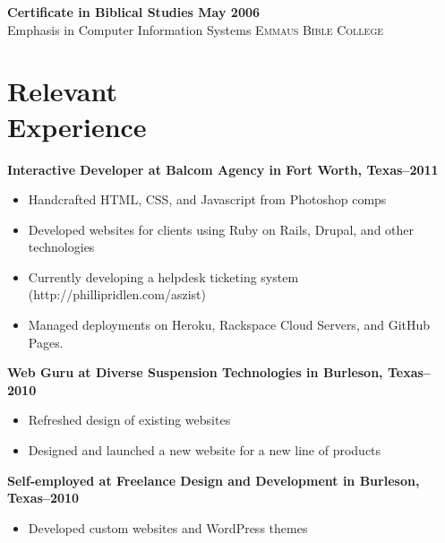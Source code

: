\documentclass[margin]{res}
\newcommand{\sectionspace}{\vspace{10pt}}
\begin{document}
\begin{resume}
                \textbf{Certificate in Biblical Studies \dotfill May 2006 }  \\
                Emphasis in Computer Information Systems \hfill \textsc{Emmaus Bible College}

\sectionspace


\section{
Relevant \\ Experience}

              
                \textbf{Interactive Developer
                 at Balcom Agency in Fort Worth, Texas--2011}
                 \vspace{-10pt}\begin{itemize} \itemsep -2pt %
                   \item Handcrafted HTML, CSS, and Javascript from Photoshop comps
                 
                   \item Developed websites for clients using Ruby on Rails, Drupal, and other technologies
                 
                   \item Currently developing a helpdesk ticketing system (http://phillipridlen.com/aszist)
                 
                   \item Managed deployments on Heroku, Rackspace Cloud Servers, and GitHub Pages.
                 \end{itemize}
              
                \textbf{Web Guru
                 at Diverse Suspension Technologies in Burleson, Texas--2010}
                 \vspace{-10pt}\begin{itemize} \itemsep -2pt %
                   \item Refreshed design of existing websites
                 
                   \item Designed and launched a new website for a new line of products
                 \end{itemize}
              
                \textbf{Self-employed
                 at Freelance Design and Development in Burleson, Texas--2010}
                 \vspace{-10pt}\begin{itemize} \itemsep -2pt %
                   \item Developed custom websites and WordPress themes
                 

\end{itemize}
\end{resume}
\end{document}
